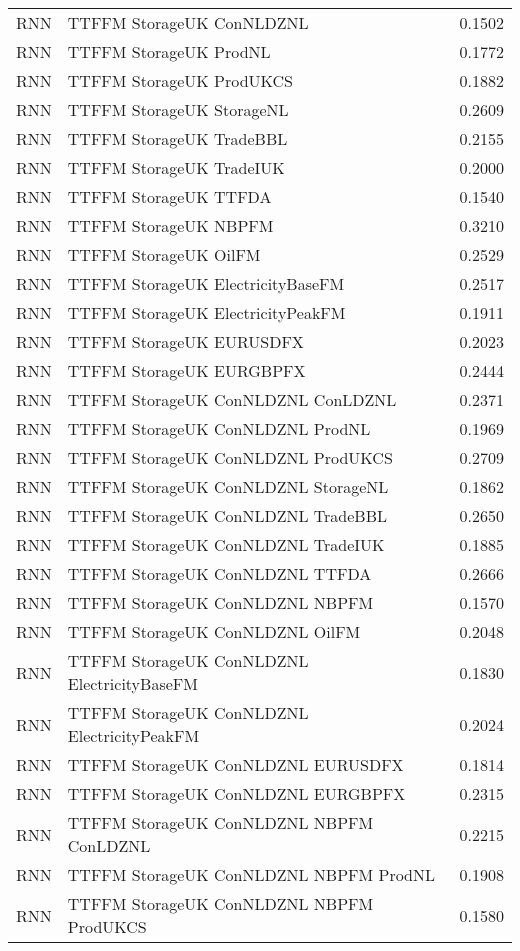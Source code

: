 \begin{table}[h!]
\begin{adjustbox}{max width=\textwidth}
\begin{tabular}{llr}
  RNN & TTFFM StorageUK ConNLDZNL & 0.1502 \\ 
  RNN & TTFFM StorageUK ProdNL & 0.1772 \\ 
  RNN & TTFFM StorageUK ProdUKCS & 0.1882 \\ 
  RNN & TTFFM StorageUK StorageNL & 0.2609 \\ 
  RNN & TTFFM StorageUK TradeBBL & 0.2155 \\ 
  RNN & TTFFM StorageUK TradeIUK & 0.2000 \\ 
  RNN & TTFFM StorageUK TTFDA & 0.1540 \\ 
  RNN & TTFFM StorageUK NBPFM & 0.3210 \\ 
  RNN & TTFFM StorageUK OilFM & 0.2529 \\ 
  RNN & TTFFM StorageUK ElectricityBaseFM & 0.2517 \\ 
  RNN & TTFFM StorageUK ElectricityPeakFM & 0.1911 \\ 
  RNN & TTFFM StorageUK EURUSDFX & 0.2023 \\ 
  RNN & TTFFM StorageUK EURGBPFX & 0.2444 \\ 
  RNN & TTFFM StorageUK ConNLDZNL ConLDZNL & 0.2371 \\ 
  RNN & TTFFM StorageUK ConNLDZNL ProdNL & 0.1969 \\ 
  RNN & TTFFM StorageUK ConNLDZNL ProdUKCS & 0.2709 \\ 
  RNN & TTFFM StorageUK ConNLDZNL StorageNL & 0.1862 \\ 
  RNN & TTFFM StorageUK ConNLDZNL TradeBBL & 0.2650 \\ 
  RNN & TTFFM StorageUK ConNLDZNL TradeIUK & 0.1885 \\ 
  RNN & TTFFM StorageUK ConNLDZNL TTFDA & 0.2666 \\ 
  RNN & TTFFM StorageUK ConNLDZNL NBPFM & 0.1570 \\ 
  RNN & TTFFM StorageUK ConNLDZNL OilFM & 0.2048 \\ 
  RNN & TTFFM StorageUK ConNLDZNL ElectricityBaseFM & 0.1830 \\ 
  RNN & TTFFM StorageUK ConNLDZNL ElectricityPeakFM & 0.2024 \\ 
  RNN & TTFFM StorageUK ConNLDZNL EURUSDFX & 0.1814 \\ 
  RNN & TTFFM StorageUK ConNLDZNL EURGBPFX & 0.2315 \\ 
  RNN & TTFFM StorageUK ConNLDZNL NBPFM ConLDZNL & 0.2215 \\ 
  RNN & TTFFM StorageUK ConNLDZNL NBPFM ProdNL & 0.1908 \\ 
  RNN & TTFFM StorageUK ConNLDZNL NBPFM ProdUKCS & 0.1580 \\ 

\end{tabular}
\end{adjustbox}
\end{table}
